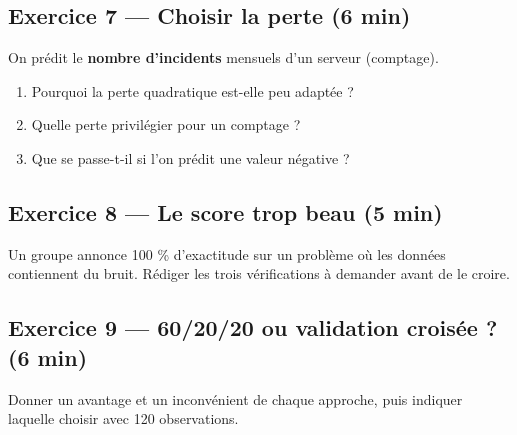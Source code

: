 \subsection*{Exercice 7 --- Choisir la perte \hfill \normalfont\footnotesize (6 min)}
On prédit le \textbf{nombre d'incidents} mensuels d'un serveur (comptage).
\begin{enumerate}
  \item Pourquoi la perte quadratique est-elle peu adaptée ?
  \item Quelle perte privilégier pour un comptage ?
  \item Que se passe-t-il si l'on prédit une valeur négative ?
\end{enumerate}

\subsection*{Exercice 8 --- Le score trop beau \hfill \normalfont\footnotesize (5 min)}
Un groupe annonce 100 \% d'exactitude sur un problème où les données contiennent
du bruit. Rédiger les trois vérifications à demander avant de le croire.

\subsection*{Exercice 9 --- 60/20/20 ou validation croisée ? \hfill \normalfont\footnotesize (6 min)}
Donner un avantage et un inconvénient de chaque approche, puis indiquer laquelle
choisir avec 120 observations.

\newpage
